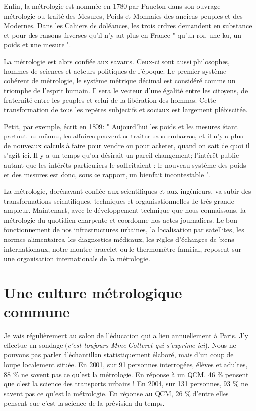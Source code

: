Enfin, la métrologie est nommée en 1780 par Paucton dans son ouvrage métrologie ou traité des Mesures, Poids et Monnaies des anciens peuples et des Modernes.  Dans les Cahiers de doléances, les trois ordres demandent en substance et pour des raisons diverses qu'il n'y ait plus en France " qu'un roi, une loi, un poids et une mesure ".

La métrologie est alors confiée aux savants. Ceux-ci sont aussi philosophes, hommes de sciences et acteurs politiques de l'époque.  Le premier système cohérent de métrologie, le système métrique décimal est considéré comme un triomphe de l'esprit humain.  Il sera le vecteur d'une égalité entre les citoyens, de fraternité entre les peuples et celui de la libération des hommes.  Cette transformation de tous les repères subjectifs et sociaux est largement plébiscitée.

Petit, par exemple, écrit en 1809: " Aujourd'hui les poids et les mesures étant partout les mêmes, les affaires peuvent se traiter sans embarras, et il n'y a plus de nouveaux calculs à faire pour vendre ou pour acheter, quand on sait de quoi il s'agit ici. Il y a un temps qu'on désirait un pareil changement; l'intérêt public autant que les intérêts particuliers le sollicitaient : le nouveau système des poids et des mesures est donc, sous ce rapport, un bienfait incontestable ".

La métrologie, dorénavant confiée aux scientifiques et aux ingénieurs, va subir des transformations scientifiques, techniques et organisationnelles de très grande ampleur. Maintenant, avec le développement technique que nous connaissons, la métrologie du quotidien charpente et coordonne nos actes journaliers.  Le bon fonctionnement de nos infrastructures urbaines, la localisation par satellites, les normes alimentaires, les diagnostics médicaux, les règles d'échanges de biens internationaux, notre montre-bracelet ou le thermomètre familial, reposent sur une organisation internationale de la métrologie.

\section{Une culture métrologique commune}

Je vais régulièrement au salon de l'éducation qui a lieu annuellement à Paris. J'y effectue un sondage (\textit{c'est toujours Mme Cotteret qui s'exprime ici}). Nous ne pouvons pas parler d'échantillon statistiquement élaboré, mais d'un coup de loupe localement située.  En 2001, sur 91 personnes interrogées, élèves et adultes, 88 \% ne savent pas ce qu'est la métrologie.  En réponse à un QCM, 46 \% pensent que c'est la science des transports urbains ! En 2004, sur 131 personnes, 93 \% ne savent pas ce qu'est la métrologie. En réponse au QCM, 26 \% d'entre elles pensent que c'est la science de la prévision du temps.

